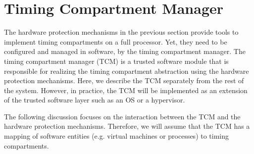 % 

\section{Timing Compartment Manager}
\label{sec:integration_tcm}
The hardware protection mechanisms in the previous section provide tools
to implement timing compartments on a full processor. Yet, they need to be
configured and managed in software, by the timing compartment manager. 
The timing compartment manager (TCM) is a trusted software module that is
responsible for realizing the timing compartment abstraction using the
hardware protection mechanisms.
Here, we describe the TCM separately from the rest of the system.
However, in practice, the TCM will be implemented as an extension of the trusted software
layer such as an OS or a hypervisor.

The following discussion focuses on the interaction between the TCM and the 
hardware protection mechanisms. Therefore, we will assume that the TCM has
a mapping of software entities (e.g. virtual machines or processes) to timing 
compartments.


